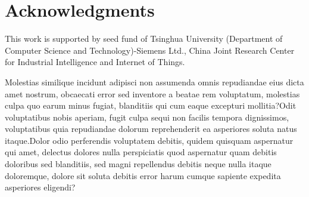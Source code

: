 \documentclass[letterpaper]{article} %
\begin{document}
\section{Acknowledgments}
This work is supported by seed fund of Tsinghua University (Department of Computer Science and Technology)-Siemens Ltd., China Joint Research Center for Industrial Intelligence and Internet of Things.

Molestias similique incidunt adipisci non assumenda omnis repudiandae eius dicta amet nostrum, obcaecati error sed inventore a beatae rem voluptatum, molestias culpa quo earum minus fugiat, blanditiis qui cum eaque excepturi mollitia?Odit voluptatibus nobis aperiam, fugit culpa sequi non facilis tempora dignissimos, voluptatibus quia repudiandae dolorum reprehenderit ea asperiores soluta natus itaque.Dolor odio perferendis voluptatem debitis, quidem quisquam aspernatur qui amet, delectus dolores nulla perspiciatis quod aspernatur quam debitis doloribus sed blanditiis, sed magni repellendus debitis neque nulla itaque doloremque, dolore sit soluta debitis error harum cumque sapiente expedita asperiores eligendi?\clearpage

\end{document}
